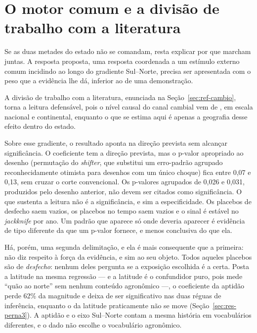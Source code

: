 \section{O motor comum e a divisão de trabalho com a literatura}
\label{sec:disc-drive}

Se as duas metades do estado não se comandam, resta explicar por que marcham
juntas. A resposta proposta, uma resposta coordenada a um estímulo externo
comum incidindo ao longo do gradiente Sul--Norte, precisa ser apresentada
com o peso que a evidência lhe dá, inferior ao de uma demonstração.

A divisão de trabalho com a literatura, enunciada na
Seção~\ref{sec:ref-cambio}, torna a leitura defensável, pois o nível causal do
canal cambial vem de , em escala nacional e
continental, enquanto o que se estima aqui é apenas a geografia desse efeito
dentro do estado.

Sobre esse gradiente, o resultado aponta na direção prevista sem alcançar
significância. O
coeficiente tem a direção prevista, mas o p-valor apropriado ao desenho
(permutação do \emph{shifter}, que substitui um erro-padrão agrupado
reconhecidamente otimista para desenhos com um único choque) fica entre
0,07 e 0,13, sem cruzar o corte convencional. Os p-valores agrupados de 0,026
e 0,031, produzidos pelo desenho anterior, não devem ser citados como
significância. O que sustenta a leitura não é
a significância, e sim a especificidade. Os placebos de desfecho saem vazios,
os placebos no tempo saem vazios e o sinal é estável no \emph{jackknife} por
ano. Um padrão que aparece só onde deveria aparecer é evidência de tipo
diferente da que um p-valor fornece, e menos conclusiva do que ela.

Há, porém, uma segunda delimitação, e ela é mais consequente que a primeira:
não diz respeito à força da evidência, e sim ao seu objeto.
Todos aqueles placebos são de \emph{desfecho}: nenhum deles pergunta se a
exposição escolhida é a certa. Posta a latitude na mesma regressão --- e a
latitude é o confundidor puro, pois mede ``quão ao norte'' sem nenhum conteúdo
agronômico ---, o coeficiente da aptidão perde 62\% da magnitude e deixa de ser
significativo nas duas réguas de inferência, enquanto o da latitude
praticamente não se move (Seção~\ref{sec:res-perna3}). A aptidão e o eixo Sul--Norte contam a mesma
história em vocabulários diferentes, e o dado não escolhe o vocabulário
agronômico.

